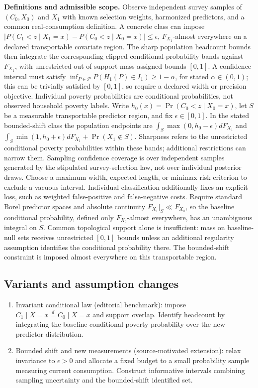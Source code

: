 \documentclass[11pt,a4paper]{article}
\begin{document}
\textbf{Definitions and admissible scope.} Observe independent survey samples of \((C_0,X_0)\) and \(X_1\) with known selection weights, harmonized predictors, and a common real-consumption definition. A concrete class can impose \(|P(C_1<z\mid X_1=x)-P(C_0<z\mid X_0=x)|\le\epsilon\), \(F_{X_1}\)-almost everywhere on a declared transportable covariate region. The sharp population headcount bounds then integrate the corresponding clipped conditional-probability bands against \(F_{X_1}\), with unrestricted out-of-support mass assigned bounds \([0,1]\). A confidence interval must satisfy \(\inf_{P\in\mathcal P}P(H_1(P)\in I_1)\ge1-\alpha\), for stated \(\alpha\in(0,1)\); this can be trivially satisfied by \([0,1]\), so require a declared width or precision objective. Individual poverty probabilities are conditional probabilities, not observed household poverty labels. Write \(h_0(x)=\Pr(C_0<z\mid X_0=x)\), let \(S\) be a measurable transportable predictor region, and fix \(\epsilon\in[0,1]\). In the stated bounded-shift class the population endpoints are \(\int_S\max(0,h_0-\epsilon)dF_{X_1}\) and \(\int_S\min(1,h_0+\epsilon)dF_{X_1}+\Pr(X_1\notin S)\). Sharpness refers to the unrestricted conditional poverty probabilities within these bands; additional restrictions can narrow them. Sampling confidence coverage is over independent samples generated by the stipulated survey-selection law, not over individual posterior draws. Choose a maximum width, expected length, or minimax risk criterion to exclude a vacuous interval. Individual classification additionally fixes an explicit loss, such as weighted false-positive and false-negative costs. Require standard Borel predictor spaces and absolute continuity \(F_{X_1}|_S\ll F_{X_0}\), so the baseline conditional probability, defined only \(F_{X_0}\)-almost everywhere, has an unambiguous integral on \(S\). Common topological support alone is insufficient: mass on baseline-null sets receives unrestricted \([0,1]\) bounds unless an additional regularity assumption identifies the conditional probability there. The bounded-shift constraint is imposed almost everywhere on this transportable region.
\subsection*{Variants and assumption changes}
\begin{enumerate}
\item Invariant conditional law (editorial benchmark): impose \(C_1\mid X=x\stackrel d=C_0\mid X=x\) and support overlap. Identify headcount by integrating the baseline conditional poverty probability over the new predictor distribution.
\item Bounded shift and new measurements (source-motivated extension): relax invariance to \(\epsilon>0\) and allocate a fixed budget to a small probability sample measuring current consumption. Construct informative intervals combining sampling uncertainty and the bounded-shift identified set.
\end{enumerate}
\end{document}
